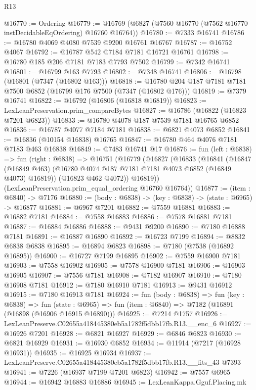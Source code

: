 \begin{lexlean}{R13}
\begin{coremodule}
@16770 := Ordering
@16779 := @16769 (@6827 (@7560 @16770 (@7562 @16770 instDecidableEqOrdering) @16760 @16764))
@16780 := @7333 @16741
@16786 := @16780 @4069 @4080 @7539 @9200 @16761 @16767
@16787 := @16752 @4067
@16792 := @16787 @542 @7184 @7181 @16721 @16761
@16798 := @16780 @185 @206 @7181 @7183 @7793 @7502
@16799 := @7342 @16741
@16801 := @16799 @163 @7793
@16802 := @7348 @16741
@16806 := @16798 (@16801 (@7347 (@16802 @163)))
@16818 := @16780 @204 @187 @7181 @7181 @7500 @6852 (@16799 @176 @7500 (@7347 (@16802 @176)))
@16819 := @7379 @16741
@16822 := @16792 (@16806 (@16818 @16819))
@16823 := LexLeanPreservation.prim_compareBytes
@16827 := @16786 (@16822 (@16823 @7201 @6823))
@16833 := @16780 @4078 @187 @7539 @7181 @16765 @6852
@16836 := @16787 @4077 @7184 @7181
@16838 := @6821 @4073 @6852
@16841 := @16836 (@10154 @16838) @16765
@16847 := @16780 @464 @4076 @7181 @7183 @463 @16838
@16849 := @7483 @16741 @17
@16876 := fun (left : @6838) =>
  fun (right : @6838) =>
  @16751
    (@16779
      (@16827
        (@16833
          (@16841
            (@16847 (@16849 @463) (@16780 @4074 @187 @7181 @7181 @4073 @6852 (@16849 @4073) @16819))
            (@16823 @462 @4072))
          @16819))
      (LexLeanPreservation.prim_equal_ordering @16760 @16764))
@16877 := (item : @6840) -> @7176
@16880 := (body : @6838) -> (key : @6838) -> (state : @6965) -> @16877
@16881 := @6967 @7201
@16882 := @7559 @16881
@16883 := @16882 @7181
@16884 := @7558 @16883
@16886 := @7578 @16881 @7181
@16887 := @16884 @16886
@16888 := @9431 @9200
@16890 := @7180 @16888 @7181
@16891 := @16887 @16890
@16892 := @16723 @7199
@16894 := @8832 @6838 @6838
@16895 := @16894 @6823
@16898 := @7180 (@7538 (@16892 @16895))
@16900 := @16727 @7199 @16895
@16902 := @7559 @16900 @7181
@16903 := @7558 @16902
@16905 := @7578 @16900 @7181
@16906 := @16903 @16905
@16907 := @7556 @7181
@16908 := @7182 @16907
@16910 := @7180 @16908 @7181
@16912 := @7180 @16910 @7181
@16913 := @9431 @16912
@16915 := @7180 @16913 @7181
@16924 := fun (body : @6838) =>
  fun (key : @6838) =>
  fun (state : @6965) => fun (item : @6840) => @7182 (@16891 (@16898 (@16906 @16915 @16890)))
@16925 := @7214 @1757
@16926 := LexLeanPreserve.C02655a418445380eb5a1782f5dbb17fb.R13.__enc_6
@16927 := @16926 @7201
@16928 := @6821 @16927
@16929 := @6846 @6823
@16930 := @6821 @16929
@16931 := @16930 @6852
@16934 := @11914 (@7217 (@16928 @16931))
@16935 := @16925 @16934
@16937 := LexLeanPreserve.C02655a418445380eb5a1782f5dbb17fb.R13.__fits_43 @7393
@16941 := @7226 (@16937 @7199 @7201 @6823)
@16942 := @7557 @6965
@16944 := @16942 @16883 @16886
@16945 := LexLeanKappa.Gguf.Placing.mk

\end{coremodule}
\end{lexlean}
